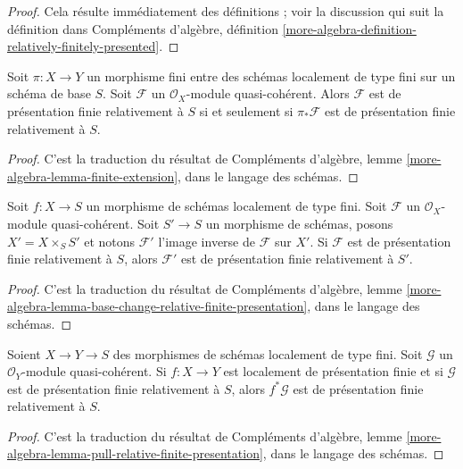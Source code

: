 \begin{proof}
Cela résulte immédiatement des définitions ; voir la
discussion qui suit la définition dans
Compléments d'algèbre, définition
\ref{more-algebra-definition-relatively-finitely-presented}.
\end{proof}

\begin{lemma}
\label{lemma-finite-morphism-relative-finite-presentation}
Soit $\pi : X \to Y$ un morphisme fini entre des schémas localement de type
fini sur un schéma de base $S$. Soit $\mathcal{F}$ un
$\mathcal{O}_X$-module quasi-cohérent. Alors $\mathcal{F}$ est de présentation finie
relativement à $S$ si et seulement si $\pi_*\mathcal{F}$ est de présentation finie
relativement à $S$.
\end{lemma}

\begin{proof}
C'est la traduction du résultat de
Compléments d'algèbre, lemme \ref{more-algebra-lemma-finite-extension},
dans le langage des schémas.
\end{proof}

\begin{lemma}
\label{lemma-base-change-relative-finite-presentation}
Soit $f : X \to S$ un morphisme de schémas localement de type
fini. Soit $\mathcal{F}$ un $\mathcal{O}_X$-module quasi-cohérent.
Soit $S' \to S$ un morphisme de schémas, posons $X' = X \times_S S'$
et notons $\mathcal{F}'$ l'image inverse de $\mathcal{F}$ sur $X'$.
Si $\mathcal{F}$ est de présentation finie relativement à $S$, alors
$\mathcal{F}'$ est de présentation finie relativement à $S'$.
\end{lemma}

\begin{proof}
C'est la traduction du résultat de
Compléments d'algèbre, lemme
\ref{more-algebra-lemma-base-change-relative-finite-presentation},
dans le langage des schémas.
\end{proof}

\begin{lemma}
\label{lemma-pull-relative-finite-presentation}
Soient $X \to Y \to S$ des morphismes de schémas localement de type
fini. Soit $\mathcal{G}$ un $\mathcal{O}_Y$-module quasi-cohérent.
Si $f : X \to Y$ est localement de présentation finie et si
$\mathcal{G}$ est de présentation finie relativement à $S$, alors
$f^*\mathcal{G}$ est de présentation finie relativement à $S$.
\end{lemma}

\begin{proof}
C'est la traduction du résultat de
Compléments d'algèbre, lemme
\ref{more-algebra-lemma-pull-relative-finite-presentation},
dans le langage des schémas.
\end{proof}

